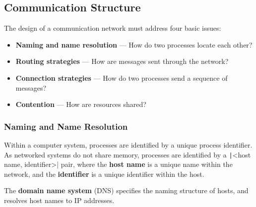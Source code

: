 \documentclass{article}
\begin{document}
\subsection{Communication Structure}
The design of a communication network must address four basic issues:
\begin{itemize}
    \item \textbf{Naming and name resolution} --- How do two processes
          locate each other?
    \item \textbf{Routing strategies} --- How are messages sent through
          the network?
    \item \textbf{Connection strategies} --- How do two processes send a
          sequence of messages?
    \item \textbf{Contention} --- How are resources shared?
\end{itemize}
\subsubsection{Naming and Name Resolution}
Within a computer system, processes are identified by a unique process
identifier. As networked systems do not share memory, processes are
identified by a \texttt|<host name, identifier>| pair, where
the \textbf{host name} is a unique name within the network, and the
\textbf{identifier} is a unique identifier within the host.

The \textbf{domain name system} (DNS) specifies the naming structure of
hosts, and resolves host names to IP addresses.
\end{document}

